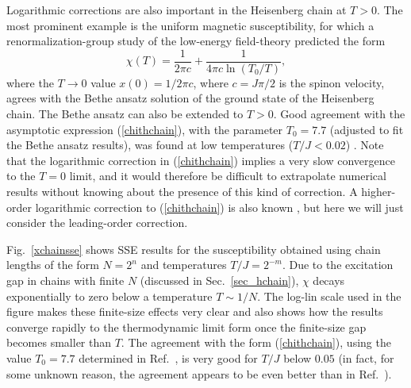 \documentclass[draft,numberedheadings]{aipproc}
\begin{document}
Logarithmic corrections are also important in the Heisenberg chain at $T>0$. The most prominent example is the uniform magnetic susceptibility, for which a 
renormalization-group study of the low-energy field-theory predicted the form \cite{eggert94,nomura93}
\begin{equation}
\chi(T) = \frac{1}{2\pi c} + \frac{1}{4\pi c \ln(T_0/T)},
\label{chithchain}
\end{equation}
where the $T\to 0$ value $x(0)=1/{2\pi c}$, where $c=J\pi/2$ is the spinon velocity, agrees with the Bethe ansatz solution of the ground state of the 
Heisenberg chain. The Bethe ansatz can also be extended to $T>0$. Good agreement with the asymptotic expression (\ref{chithchain}), with the parameter 
$T_0=7.7$ (adjusted to fit the Bethe ansatz results), was found at low temperatures ($T/J < 0.02$) \cite{eggert94}. Note that the logarithmic correction 
in (\ref{chithchain}) implies a very slow convergence to the $T=0$ limit, and it would therefore be difficult to extrapolate numerical results without 
knowing about the presence of this kind of correction. A higher-order logarithmic correction to (\ref{chithchain}) is also known \cite{nomura93}, but 
here we will just consider the leading-order correction.

Fig.~\ref{xchainsse} shows SSE results for the susceptibility obtained using chain lengths of the form $N=2^n$ and temperatures $T/J=2^{-m}$. Due to
the excitation gap in chains with finite $N$ (discussed in Sec.~\ref{sec_hchain}), $\chi$ decays exponentially to zero below a temperature $T \sim 1/N$.
The log-lin scale used in the figure makes these finite-size effects very clear and also shows how the results converge rapidly to the thermodynamic
limit form once the finite-size gap becomes smaller than $T$. The agreement with the form (\ref{chithchain}), using the value $T_0 =7.7$ determined in
Ref.~\cite{eggert94}, is very good for $T/J$ below $0.05$ (in fact, for some unknown reason, the agreement appears to be even better than in 
Ref.~\cite{eggert94}).
\end{document}
